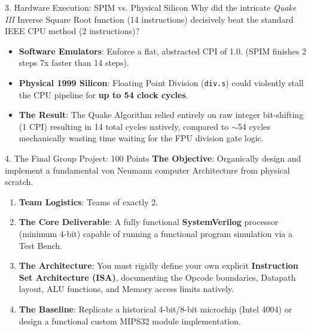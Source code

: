 \documentclass[aspectratio=169]{beamer}
\begin{document}
\begin{frame}{3. Hardware Execution: SPIM vs. Physical Silicon}
Why did the intricate \textit{Quake III} Inverse Square Root function (14 instructions) decisively beat the standard IEEE CPU method (2 instructions)?
\vspace{0.2cm}
\begin{itemize}
    \item \textbf{Software Emulators}: Enforce a flat, abstracted CPI of 1.0. (SPIM finishes 2 steps 7x faster than 14 steps).
    \item \textbf{Physical 1999 Silicon}: Floating Point Division (\texttt{div.s}) could violently stall the CPU pipeline for \textbf{up to 54 clock cycles}. 
    \item \textbf{The Result}: The Quake Algorithm relied entirely on raw integer bit-shifting (1 CPI) resulting in 14 total cycles natively, compared to $\sim$54 cycles mechanically wasting time waiting for the FPU division gate logic.
\end{itemize}
\end{frame}

\begin{frame}{4. The Final Group Project: 100 Points}
\textbf{The Objective}: Organically design and implement a fundamental von Neumann computer Architecture from physical scratch.
\vspace{0.2cm}
\begin{enumerate}
    \item \textbf{Team Logistics}: Teams of exactly 2.
    \item \textbf{The Core Deliverable}: A fully functional \textbf{SystemVerilog} processor (minimum 4-bit) capable of running a functional program simulation via a Test Bench.
    \item \textbf{The Architecture}: You must rigidly define your own explicit \textbf{Instruction Set Architecture (ISA)}, documenting the Opcode boundaries, Datapath layout, ALU functions, and Memory access limits natively.
    \item \textbf{The Baseline}: Replicate a historical 4-bit/8-bit microchip (Intel 4004) or design a functional custom MIPS32 module implementation.
\end{enumerate}
\end{frame}
\end{document}
